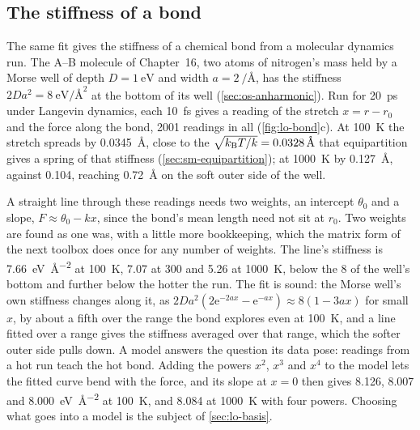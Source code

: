 \subsection*{The stiffness of a bond}

The same fit gives the stiffness of a chemical bond from a molecular
dynamics run. The A--B molecule of Chapter~16, two atoms of nitrogen's
mass held by a Morse well of depth $D = \SI{1}{\electronvolt}$ and width
$a = \SI{2}{\per\angstrom}$, has the stiffness $2Da^2 =
\SI{8}{\electronvolt\per\angstrom\squared}$ at the bottom of its well
(\cref{sec:os-anharmonic}). Run for \SI{20}{\pico\second} under Langevin
dynamics, each \SI{10}{\femto\second} gives a reading of the stretch $x
= r - r_0$ and the force along the bond, 2001 readings in all
(\cref{fig:lo-bond}c). At \SI{100}{\kelvin} the stretch spreads by
\SI{0.0345}{\angstrom}, close to the $\sqrt{k_{\mathrm{B}} T/k} =
\SI{0.0328}{\angstrom}$ that equipartition gives a spring of that
stiffness (\cref{sec:sm-equipartition}); at \SI{1000}{\kelvin} by
\SI{0.127}{\angstrom}, against \num{0.104}, reaching
\SI{0.72}{\angstrom} on the soft outer side of the well.

A straight line through these readings needs two weights, an intercept
$\theta_0$ and a slope, $F \approx \theta_0 - kx$, since the bond's mean length need
not sit at $r_0$. Two weights are found as one was, with a little more
bookkeeping, which the matrix form of the next toolbox does once for any
number of weights. The line's stiffness is \SI{7.66}{\electronvolt\per
\angstrom\squared} at \SI{100}{\kelvin}, 7.07 at 300 and 5.26 at
\SI{1000}{\kelvin}, below the 8 of the well's bottom and further below
the hotter the run. The fit is sound: the Morse well's own
stiffness changes along it, as $2Da^2(2\mathrm{e}^{-2ax} -
\mathrm{e}^{-ax}) \approx 8(1 - 3ax)$ for small $x$, by about a fifth
over the range the bond explores even at \SI{100}{\kelvin}, and a line
fitted over a range gives the stiffness averaged over that range, which
the softer outer side pulls down. A model answers the question its data
pose: readings from a hot run teach the hot bond. Adding the powers $x^2$,
$x^3$ and $x^4$ to the model lets the fitted curve bend with the force,
and its slope at $x = 0$ then gives 8.126, 8.007 and
\SI{8.000}{\electronvolt\per\angstrom\squared} at \SI{100}{\kelvin}, and
\num{8.084} at \SI{1000}{\kelvin} with four powers. Choosing what goes
into a model is the subject of \cref{sec:lo-basis}.

